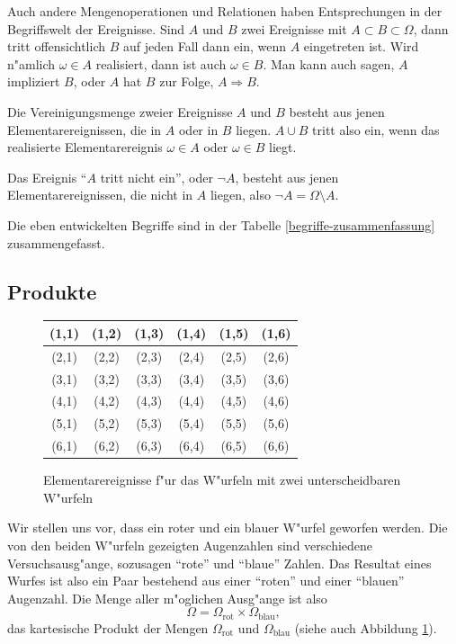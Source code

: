 Auch andere Mengenoperationen und Relationen haben Entsprechungen
in der Begriffswelt der Ereignisse. Sind $A$ und $B$ zwei Ereignisse
mit $A\subset B\subset\Omega$, dann tritt offensichtlich $B$ auf
jeden Fall dann ein, wenn $A$ eingetreten ist. Wird n"amlich $\omega\in A$
realisiert, dann ist auch $\omega\in B$. Man kann auch sagen, $A$ impliziert
$B$, oder $A$ hat $B$ zur Folge, $A\Rightarrow B$.

Die Vereinigungsmenge
zweier Ereignisse $A$ und $B$ besteht aus jenen
Elementarereignissen, die in $A$ oder in $B$ liegen. $A\cup B$ tritt
also ein, wenn das realisierte Elementarereignis $\omega\in A$
oder $\omega\in B$ liegt.

Das Ereignis
``$A$ tritt nicht ein'', oder $\lnot A$, besteht aus
jenen Elementarereignissen, die nicht in $A$ liegen,
also $\lnot A=\Omega\setminus A$.

Die eben entwickelten Begriffe sind in der Tabelle
\ref{begriffe-zusammenfassung} zusammengefasst.

\subsection{Produkte}
\begin{figure}
\begin{center}
\begin{tabular}{|c|c|c|c|c|c|}
\hline
(1,1)&(1,2)&(1,3)&(1,4)&(1,5)&(1,6)\\
\hline
(2,1)&(2,2)&(2,3)&(2,4)&(2,5)&(2,6)\\
\hline
(3,1)&(3,2)&(3,3)&(3,4)&(3,5)&(3,6)\\
\hline
(4,1)&(4,2)&(4,3)&(4,4)&(4,5)&(4,6)\\
\hline
(5,1)&(5,2)&(5,3)&(5,4)&(5,5)&(5,6)\\
\hline
(6,1)&(6,2)&(6,3)&(6,4)&(6,5)&(6,6)\\
\hline
\end{tabular}
\end{center}
\caption{Elementarereignisse f"ur das W"urfeln mit zwei unterscheidbaren
W"urfeln\label{ereignisse-zwei-wuerfel}}
\end{figure}
Wir stellen uns vor, dass ein roter und ein blauer W"urfel geworfen werden.
Die von den beiden W"urfeln gezeigten Augenzahlen sind verschiedene
Versuchsausg"ange, sozusagen ``rote'' und ``blaue'' Zahlen. Das Resultat
eines Wurfes ist also ein Paar bestehend aus einer ``roten'' und
einer ``blauen'' Augenzahl. Die Menge aller m"oglichen Ausg"ange
ist also 
\[
\Omega = \Omega_{\text{rot}}\times\Omega_{\text{blau}},
\]
das kartesische Produkt der Mengen $\Omega_{\text{rot}}$ und
$\Omega_{\text{blau}}$ (siehe auch Abbildung \ref{ereignisse-zwei-wuerfel}).

